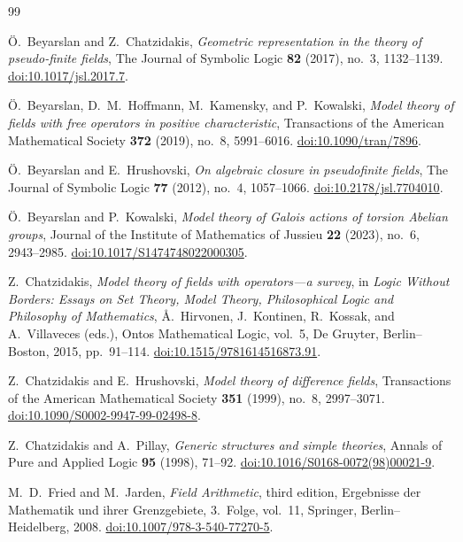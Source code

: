 \documentclass[10pt,a4paper]{amsart}
\theoremstyle{definition}
\begin{document}
\begin{thebibliography}{99}
\small
\raggedright

\"O.~Beyarslan and Z.~Chatzidakis,
\emph{Geometric representation in the theory of pseudo-finite fields},
The Journal of Symbolic Logic
\textbf{82} (2017), no.~3, 1132--1139.
\href{https://doi.org/10.1017/jsl.2017.7}
{doi:10.1017/jsl.2017.7}.

\"O.~Beyarslan, D.~M.~Hoffmann, M.~Kamensky, and P.~Kowalski,
\emph{Model theory of fields with free operators in positive characteristic},
Transactions of the American Mathematical Society
\textbf{372} (2019), no.~8, 5991--6016.
\href{https://doi.org/10.1090/tran/7896}
{doi:10.1090/tran/7896}.

\"O.~Beyarslan and E.~Hrushovski,
\emph{On algebraic closure in pseudofinite fields},
The Journal of Symbolic Logic
\textbf{77} (2012), no.~4, 1057--1066.
\href{https://doi.org/10.2178/jsl.7704010}
{doi:10.2178/jsl.7704010}.


\"O.~Beyarslan and P.~Kowalski,
\emph{Model theory of Galois actions of torsion Abelian groups},
Journal of the Institute of Mathematics of Jussieu
\textbf{22} (2023), no.~6, 2943--2985.
\href{https://doi.org/10.1017/S1474748022000305}
{doi:10.1017/S1474748022000305}.


Z.~Chatzidakis,
\emph{Model theory of fields with operators---a survey},
in \emph{Logic Without Borders: Essays on Set Theory, Model Theory,
Philosophical Logic and Philosophy of Mathematics},
\AA.~Hirvonen, J.~Kontinen, R.~Kossak, and A.~Villaveces (eds.),
Ontos Mathematical Logic, vol.~5,
De Gruyter, Berlin--Boston, 2015, pp.~91--114.
\href{https://doi.org/10.1515/9781614516873.91}
{doi:10.1515/9781614516873.91}.

Z.~Chatzidakis and E.~Hrushovski,
\emph{Model theory of difference fields},
Transactions of the American Mathematical Society
\textbf{351} (1999), no.~8, 2997--3071.
\href{https://doi.org/10.1090/S0002-9947-99-02498-8}
{doi:10.1090/S0002-9947-99-02498-8}.

Z.~Chatzidakis and A.~Pillay,
\emph{Generic structures and simple theories},
Annals of Pure and Applied Logic
\textbf{95} (1998), 71--92.
\href{https://doi.org/10.1016/S0168-0072(98)00021-9}
{doi:10.1016/S0168-0072(98)00021-9}.

M.~D.~Fried and M.~Jarden,
\emph{Field Arithmetic},
third edition,
Ergebnisse der Mathematik und ihrer Grenzgebiete, 3.~Folge,
vol.~11, Springer, Berlin--Heidelberg, 2008.
\href{https://doi.org/10.1007/978-3-540-77270-5}
{doi:10.1007/978-3-540-77270-5}.


\end{thebibliography}
\end{document}
